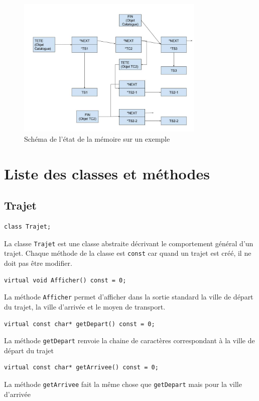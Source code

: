 \documentclass[11pt, a4paper]{article}
\begin{document}
\begin{figure}[H]
    \centering
    \includegraphics[trim = 0mm 5mm 0mm 5mm, clip, width = 0.8\textwidth]{Struct}
    \caption{Schéma de l'état de la mémoire sur un exemple\label{fig:struct}}
\end{figure}

\section{Liste des classes et méthodes}
\subsection{Trajet}
\begin{lstlisting}
class Trajet;
\end{lstlisting}
La classe \texttt{Trajet} est une classe abstraite décrivant le comportement général d'un trajet.
Chaque méthode de la classe est \texttt{const} car quand un trajet est créé, il ne doit pas être
modifier.

\begin{lstlisting}
virtual void Afficher() const = 0;
\end{lstlisting}
La méthode \texttt{Afficher} permet d'afficher dans la sortie standard la ville de départ du trajet, la
ville d'arrivée et le moyen de transport.

\begin{lstlisting}
virtual const char* getDepart() const = 0;
\end{lstlisting}
La méthode \texttt{getDepart} renvoie la chaine de caractères correspondant à la ville de départ du
trajet

\begin{lstlisting}
virtual const char* getArrivee() const = 0;
\end{lstlisting}
La méthode \texttt{getArrivee} fait la même chose que \texttt{getDepart} mais pour la ville
d'arrivée\\
\end{document}
